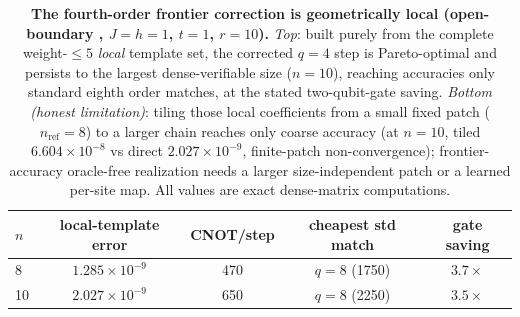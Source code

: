 \begin{table}[t]
\caption{\textbf{The fourth-order frontier correction is geometrically local (open-boundary \tfim{}, $J=h=1$, $t=1$, $r=10$).} \emph{Top}: built purely from the complete weight-$\leq5$ \emph{local} template set, the corrected $q=4$ step is Pareto-optimal and persists to the largest dense-verifiable size ($n=10$), reaching accuracies only standard eighth order matches, at the stated two-qubit-gate saving. \emph{Bottom (honest limitation)}: tiling those local coefficients from a small fixed patch ($n_{\mathrm{ref}}=8$) to a larger chain reaches only coarse accuracy (at $n=10$, tiled $6.604\times10^{-8}$ vs direct $2.027\times10^{-9}$, finite-patch non-convergence); frontier-accuracy oracle-free realization needs a larger size-independent patch or a learned per-site map. All values are exact dense-matrix computations.}
\label{tab:oracle-free-q4}
\centering
\begin{tabular}{lcccc}
\toprule
$n$ & local-template error & CNOT/step & cheapest std match & gate saving\\
\midrule
8 & $1.285\times10^{-9}$ & 470 & $q=8$ (1750) & $3.7\times$\\
10 & $2.027\times10^{-9}$ & 650 & $q=8$ (2250) & $3.5\times$\\
\bottomrule
\end{tabular}
\end{table}
